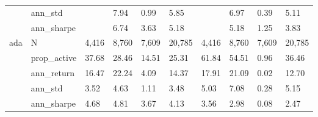 \begin{tabular}{llllllllll}
    & ann\_std &        &   7.94 &   0.99 &    5.85 &        &   6.97 &   0.39 &    5.11 \\
    & ann\_sharpe &        &   6.74 &   3.63 &    5.18 &        &   5.18 &   1.25 &    3.83 \\
ada & N &  4,416 &  8,760 &  7,609 &  20,785 &  4,416 &  8,760 &  7,609 &  20,785 \\
    & prop\_active &  37.68 &  28.46 &  14.51 &   25.31 &  61.84 &  54.51 &   0.96 &   36.46 \\
    & ann\_return &  16.47 &  22.24 &   4.09 &   14.37 &  17.91 &  21.09 &   0.02 &   12.70 \\
    & ann\_std &   3.52 &   4.63 &   1.11 &    3.48 &   5.03 &   7.08 &   0.28 &    5.15 \\
    & ann\_sharpe &   4.68 &   4.81 &   3.67 &    4.13 &   3.56 &   2.98 &   0.08 &    2.47 \\
\bottomrule
\end{tabular}
